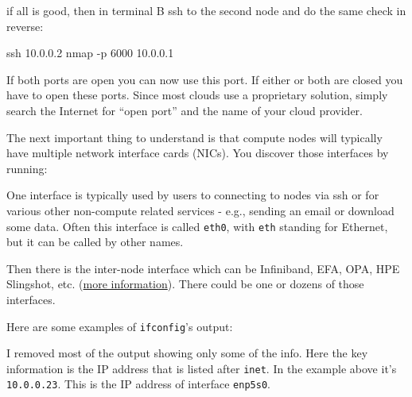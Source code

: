 \documentclass[
]{report}
\newenvironment{Shaded}{\begin{snugshade}}{\end{snugshade}}
\newcommand{\AttributeTok}[1]{\textcolor[rgb]{0.40,0.45,0.13}{#1}}
\newcommand{\ExtensionTok}[1]{\textcolor[rgb]{0.00,0.23,0.31}{#1}}
\newcommand{\FunctionTok}[1]{\textcolor[rgb]{0.28,0.35,0.67}{#1}}
\newcommand{\NormalTok}[1]{\textcolor[rgb]{0.00,0.23,0.31}{#1}}
\newcommand{\OperatorTok}[1]{\textcolor[rgb]{0.37,0.37,0.37}{#1}}
\begin{document}
if all is good, then in terminal B ssh to the second node and do the
same check in reverse:

\begin{Shaded}
\begin{Highlighting}[]
\FunctionTok{ssh}\NormalTok{ 10.0.0.2}
\FunctionTok{nmap} \AttributeTok{{-}p}\NormalTok{ 6000 10.0.0.1}
\end{Highlighting}
\end{Shaded}

If both ports are open you can now use this port. If either or both are
closed you have to open these ports. Since most clouds use a proprietary
solution, simply search the Internet for ``open port'' and the name of
your cloud provider.

The next important thing to understand is that compute nodes will
typically have multiple network interface cards (NICs). You discover
those interfaces by running:

\begin{Shaded}
\end{Shaded}

One interface is typically used by users to connecting to nodes via ssh
or for various other non-compute related services - e.g., sending an
email or download some data. Often this interface is called
\texttt{eth0}, with \texttt{eth} standing for Ethernet, but it can be
called by other names.

Then there is the inter-node interface which can be Infiniband, EFA,
OPA, HPE Slingshot, etc. (\href{../network\#inter-node-networking}{more
information}). There could be one or dozens of those interfaces.

Here are some examples of \texttt{ifconfig}'s output:

\begin{Shaded}
\end{Shaded}

I removed most of the output showing only some of the info. Here the key
information is the IP address that is listed after \texttt{inet}. In the
example above it's \texttt{10.0.0.23}. This is the IP address of
interface \texttt{enp5s0}.
\end{document}
